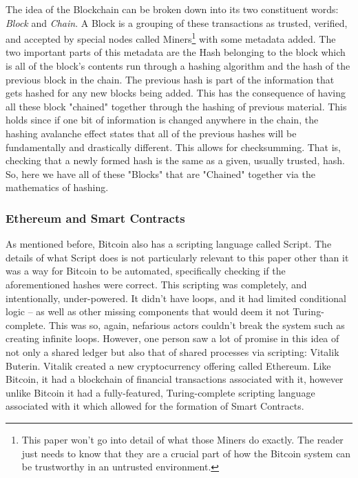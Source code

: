 			\hspace{10mm}The idea of the Blockchain can be broken down into its two constituent words: \textit{Block} and \textit{Chain}. A Block is a grouping of these transactions as trusted, verified, and accepted by special nodes called Miners\footnote{This paper won't go into detail of what those Miners do exactly. The reader just needs to know that they are a crucial part of how the Bitcoin system can be trustworthy in an untrusted environment.} with some metadata added. The two important parts of this metadata are the Hash belonging to the block which is all of the block's contents run through a hashing algorithm and the hash of the previous block in the chain. The previous hash is part of the information that gets hashed for any new blocks being added. This has the consequence of having all these block "chained" together through the hashing of previous material. This holds since if one bit of information is changed anywhere in the chain, the hashing avalanche effect states that all of the previous hashes will be fundamentally and drastically different. This allows for checksumming. That is, checking that a newly formed hash is the same as a given, usually trusted, hash. So, here we have all of these "Blocks" that are "Chained" together via the mathematics of hashing.\\
			
		\subsubsection{Ethereum and Smart Contracts}
			\hspace{10mm}As mentioned before, Bitcoin also has a scripting language called Script. The details of what Script does is not particularly relevant to this paper other than it was a way for Bitcoin to be automated, specifically checking if the aforementioned hashes were correct. This scripting was completely, and intentionally, under-powered. It didn't have loops, and it had limited conditional logic -- as well as other missing components that would deem it not Turing-complete. This was so, again, nefarious actors couldn't break the system such as creating infinite loops. However, one person saw a lot of promise in this idea of not only a shared ledger but also that of shared processes via scripting: Vitalik Buterin. Vitalik created a new cryptocurrency offering called Ethereum. Like Bitcoin, it had a blockchain of financial transactions associated with it, however unlike Bitcoin it had a fully-featured, Turing-complete scripting language associated with it which allowed for the formation of Smart Contracts.\\
			
